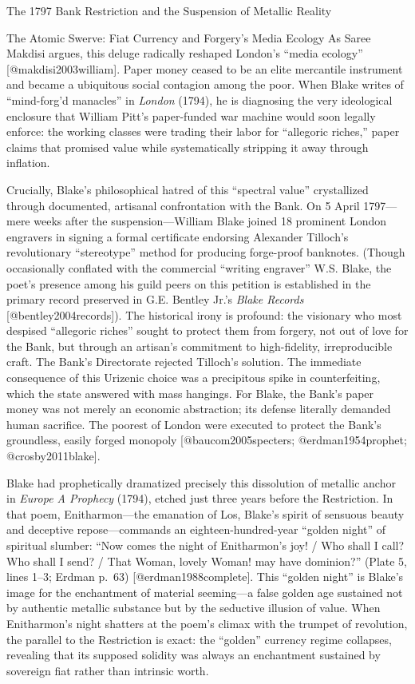 \documentclass[
  ignorenonframetext,
]{beamer}
\begin{document}
\begin{frame}{The 1797 Bank Restriction and the Suspension of Metallic
Reality}
\begin{block}{The Atomic Swerve: Fiat Currency and Forgery's Media
Ecology}
As Saree Makdisi argues, this deluge radically reshaped London's ``media
ecology'' {[}@makdisi2003william{]}. Paper money ceased to be an elite
mercantile instrument and became a ubiquitous social contagion among the
poor. When Blake writes of ``mind-forg'd manacles'' in \emph{London}
(1794), he is diagnosing the very ideological enclosure that William
Pitt's paper-funded war machine would soon legally enforce: the working
classes were trading their labor for ``allegoric riches,'' paper claims
that promised value while systematically stripping it away through
inflation.

Crucially, Blake's philosophical hatred of this ``spectral value''
crystallized through documented, artisanal confrontation with the Bank.
On 5 April 1797---mere weeks after the suspension---William Blake joined
18 prominent London engravers in signing a formal certificate endorsing
Alexander Tilloch's revolutionary ``stereotype'' method for producing
forge-proof banknotes. (Though occasionally conflated with the
commercial ``writing engraver'' W.S. Blake, the poet's presence among
his guild peers on this petition is established in the primary record
preserved in G.E. Bentley Jr.'s \emph{Blake Records}
{[}@bentley2004records{]}). The historical irony is profound: the
visionary who most despised ``allegoric riches'' sought to protect them
from forgery, not out of love for the Bank, but through an artisan's
commitment to high-fidelity, irreproducible craft. The Bank's
Directorate rejected Tilloch's solution. The immediate consequence of
this Urizenic choice was a precipitous spike in counterfeiting, which
the state answered with mass hangings. For Blake, the Bank's paper money
was not merely an economic abstraction; its defense literally demanded
human sacrifice. The poorest of London were executed to protect the
Bank's groundless, easily forged monopoly {[}@baucom2005specters;
@erdman1954prophet; @crosby2011blake{]}.

Blake had prophetically dramatized precisely this dissolution of
metallic anchor in \emph{Europe A Prophecy} (1794), etched just three
years before the Restriction. In that poem, Enitharmon---the emanation
of Los, Blake's spirit of sensuous beauty and deceptive
repose---commands an eighteen-hundred-year ``golden night'' of spiritual
slumber: ``Now comes the night of Enitharmon's joy! / Who shall I call?
Who shall I send? / That Woman, lovely Woman! may have dominion?''
(Plate 5, lines 1--3; Erdman p.~63) {[}@erdman1988complete{]}. This
``golden night'' is Blake's image for the enchantment of material
seeming---a false golden age sustained not by authentic metallic
substance but by the seductive illusion of value. When Enitharmon's
night shatters at the poem's climax with the trumpet of revolution, the
parallel to the Restriction is exact: the ``golden'' currency regime
collapses, revealing that its supposed solidity was always an
enchantment sustained by sovereign fiat rather than intrinsic worth.


\end{block}
\end{frame}
\end{document}
